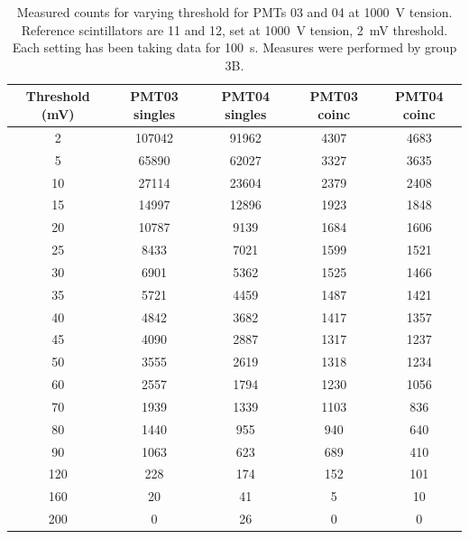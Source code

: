 \documentclass[../main.tex]{subfiles}
\begin{document}
\begin{table}[b!]
    \centering
    \caption{Measured counts for varying threshold for PMTs 03 and 04 at \SI{1000}{\volt}  tension. Reference scintillators are 11 and 12, set at \SI{1000}{\volt} tension, \SI{2}{\milli \volt} threshold. Each setting has been taking data for \SI{100}{\second}. Measures were performed by group 3B.}
            \label{tab:threshold3B}
        \begin{tabular}{|c|cc|cc|}
        \hline
        Threshold (mV) & PMT03 singles & PMT04 singles & PMT03 coinc & PMT04 coinc \\ \hline
        \phantom{00}2 & 107042           & 91962           & 4307        & 4683        \\
        \phantom{00}5 & \phantom{0}65890 & 62027           & 3327        & 3635        \\
        \phantom{0}10 & \phantom{0}27114 & 23604           & 2379        & 2408        \\
        \phantom{0}15 & \phantom{0}14997 & 12896           & 1923        & 1848        \\
        \phantom{0}20 & \phantom{0}10787 & \phantom{0}9139 & 1684        & 1606        \\
        \phantom{0}25 & \phantom{00}8433 & \phantom{0}7021 & 1599        & 1521        \\
        \phantom{0}30 & \phantom{00}6901 & \phantom{0}5362 & 1525        & 1466        \\
        \phantom{0}35 & \phantom{00}5721 & \phantom{0}4459 & 1487        & 1421        \\
        \phantom{0}40 & \phantom{00}4842 & \phantom{0}3682 & 1417        & 1357        \\
        \phantom{0}45 & \phantom{00}4090 & \phantom{0}2887 & 1317        & 1237        \\
        \phantom{0}50 & \phantom{00}3555 & \phantom{0}2619 & 1318        & 1234        \\
        \phantom{0}60 & \phantom{00}2557 & \phantom{0}1794 & 1230        & 1056        \\
        \phantom{0}70 & \phantom{00}1939 & \phantom{0}1339 & 1103        & \phantom{0}836 \\
        \phantom{0}80 & \phantom{00}1440 & \phantom{00}955 & \phantom{0}940 & \phantom{0}640 \\
        \phantom{0}90 & \phantom{00}1063 & \phantom{00}623 & \phantom{0}689 & \phantom{0}410 \\
        120           & \phantom{000}228 & \phantom{00}174 & \phantom{0}152 & \phantom{0}101 \\
        160           & \phantom{0000}20 & \phantom{000}41 & \phantom{000}5 & \phantom{00}10 \\
        200           & \phantom{00000}0 & \phantom{000}26 & \phantom{000}0 & \phantom{000}0 \\ \hline
        \end{tabular}
\end{table}
        
\end{document}
